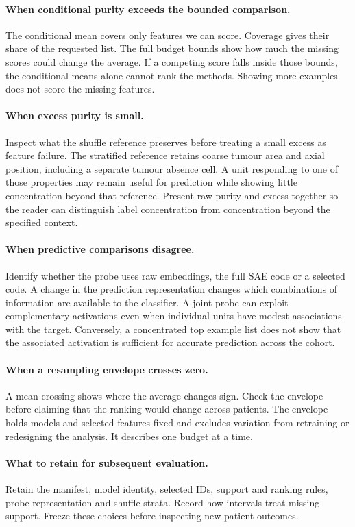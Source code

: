\documentclass[letterpaper]{article}
\begin{document}
\paragraph{When conditional purity exceeds the bounded comparison.}
The conditional mean covers only features we can score. Coverage gives their share of the requested list. The full budget bounds show how much the missing scores could change the average. If a competing score falls inside those bounds, the conditional means alone cannot rank the methods. Showing more examples does not score the missing features.

\paragraph{When excess purity is small.}
Inspect what the shuffle reference preserves before treating a small excess as feature failure. The stratified reference retains coarse tumour area and axial position, including a separate tumour absence cell. A unit responding to one of those properties may remain useful for prediction while showing little concentration beyond that reference. Present raw purity and excess together so the reader can distinguish label concentration from concentration beyond the specified context.

\paragraph{When predictive comparisons disagree.}
Identify whether the probe uses raw embeddings, the full SAE code or a selected code. A change in the prediction representation changes which combinations of information are available to the classifier. A joint probe can exploit complementary activations even when individual units have modest associations with the target. Conversely, a concentrated top example list does not show that the associated activation is sufficient for accurate prediction across the cohort.

\paragraph{When a resampling envelope crosses zero.}
A mean crossing shows where the average changes sign. Check the envelope before claiming that the ranking would change across patients. The envelope holds models and selected features fixed and excludes variation from retraining or redesigning the analysis. It describes one budget at a time.

\paragraph{What to retain for subsequent evaluation.}
Retain the manifest, model identity, selected IDs, support and ranking rules, probe representation and shuffle strata. Record how intervals treat missing support. Freeze these choices before inspecting new patient outcomes.
\end{document}
